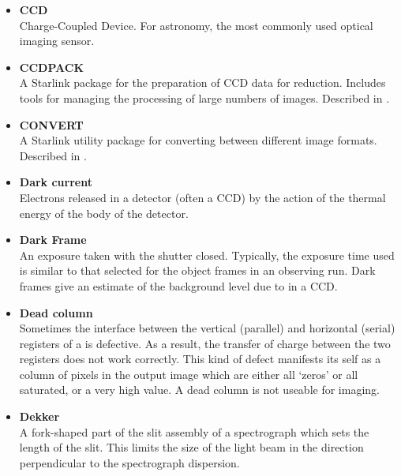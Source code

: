 \documentclass[twoside,11pt]{starlink}
\begin{document}
\begin{itemize}
\item {\bf\label{gl_ccd}CCD}\\
      Charge-Coupled Device.   For astronomy, the most commonly used
      optical imaging sensor.

\item {\bf\label{gl_ccdpack}CCDPACK}\\
      A Starlink package for the preparation of CCD data for reduction.
      Includes tools for managing the processing of large numbers of
      images.  Described in .

\item {\bf\label{gl_convert}CONVERT}\\
      A Starlink utility package for converting between different image
      formats.  Described in \cite{convert}.

\item {\bf\label{gl_dark_current}Dark current}\\
      Electrons released in a detector (often a CCD) by the action of
      the thermal energy of the body of the detector.

\item {\bf\label{gl_dark_frame}Dark Frame}\\
      An exposure taken with the shutter closed.  Typically, the
      exposure time used is similar to that selected for the object
      frames in an observing run.  Dark frames give an estimate of
      the background level due to 
      in a CCD.

\item {\bf\label{gl_dead_column}Dead column}\\
      Sometimes the interface between the vertical (parallel) and horizontal
      (serial) registers of a  is defective.  As a
      result, the transfer of charge between the two registers does not
      work correctly.  This kind of defect manifests its self as a column
      of pixels in the output image which are either all `zeros' or all
      saturated, or a very high value.  A dead column is not useable
      for imaging.

\item {\bf\label{gl_dekker}Dekker}\\
      A fork-shaped part of the slit assembly of a spectrograph which
      sets the length of the slit.  This limits the size of the light
      beam in the direction perpendicular to the spectrograph dispersion.


\end{itemize}
\end{document}
